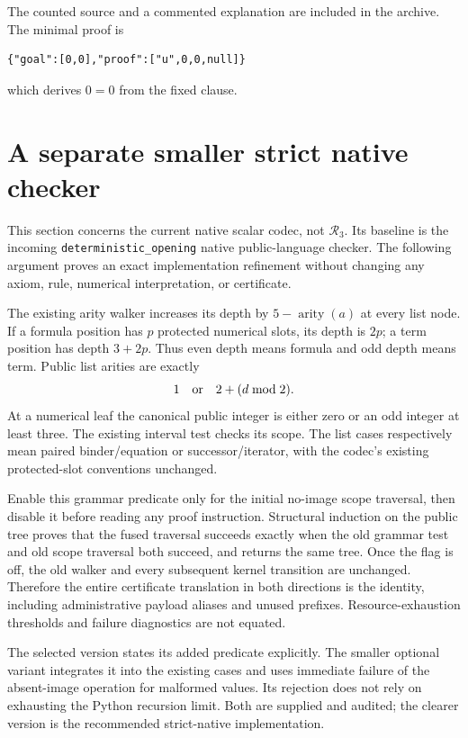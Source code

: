 \documentclass[11pt,letterpaper]{article}
\theoremstyle{definition}\newtheorem{definition}[theorem]{Definition}
\theoremstyle{remark}\newtheorem{remark}[theorem]{Remark}
\newcommand{\RN}{\mathcal R_3}
\begin{document}
The counted source and a commented explanation are included in the
archive. The minimal proof is
\begin{lstlisting}
{"goal":[0,0],"proof":["u",0,0,null]}
\end{lstlisting}
which derives $0=0$ from the fixed clause.

\section{A separate smaller strict native checker}\label{sec:fusion}

This section concerns the current native scalar codec, not $\RN$.
Its baseline is the incoming \texttt{deterministic\_opening}
native public-language checker. The following argument proves
an exact implementation refinement without changing any axiom,
rule, numerical interpretation, or certificate.

The existing arity walker increases its depth by
$5-\operatorname{arity}(a)$ at every list node. If a formula
position has $p$ protected numerical slots, its depth is $2p$;
a term position has depth $3+2p$. Thus even depth means formula
and odd depth means term. Public list arities are exactly
\[
                   1\quad\hbox{or}\quad 2+(d\bmod2).
\]
At a numerical leaf the canonical public integer is either zero
or an odd integer at least three. The existing interval test
checks its scope. The list cases respectively mean paired
binder/equation or successor/iterator, with the codec's existing
protected-slot conventions unchanged.

Enable this grammar predicate only for the initial no-image
scope traversal, then disable it before reading any proof
instruction. Structural induction on the public tree proves
that the fused traversal succeeds exactly when the old grammar
test and old scope traversal both succeed, and returns the
same tree. Once the flag is off, the old walker and every
subsequent kernel transition are unchanged. Therefore the
entire certificate translation in both directions is the
identity, including administrative payload aliases and unused
prefixes. Resource-exhaustion thresholds and failure diagnostics
are not equated.

The selected version states its added predicate explicitly.
The smaller optional variant integrates it into the existing
cases and uses immediate failure of the absent-image operation
for malformed values. Its rejection does not rely on exhausting
the Python recursion limit. Both are supplied and audited;
the clearer version is the recommended strict-native implementation.
\end{document}
